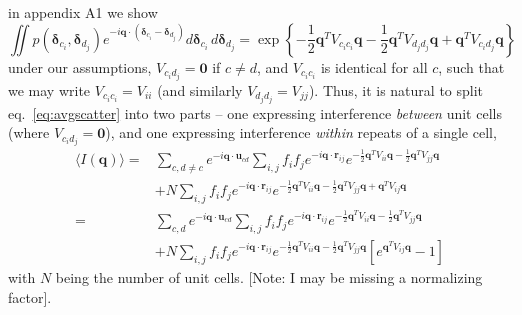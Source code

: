 \documentclass{article}
\begin{document}
in appendix A1 we show 
\begin{equation}
\iint p( \boldsymbol{\delta}_{c_i},  \boldsymbol{\delta}_{d_j} )
e^{-i \mathbf{q} \cdot ( \boldsymbol{\delta}_{c_i}  - \boldsymbol{\delta}_{d_j})} 
d \boldsymbol{\delta}_{c_i}  \, d \boldsymbol{\delta}_{d_j}
=
\exp \left\{
- \frac{1}{2} \mathbf{q}^T V_{c_i c_i} \mathbf{q}
- \frac{1}{2} \mathbf{q}^T V_{d_j d_j} \mathbf{q}
+ \mathbf{q}^T V_{c_i d_j} \mathbf{q}
\right\}
\label{eq:disorder_term}
\end{equation}
under our assumptions, $V_{c_i d_j} = \mathbf{0}$ if $c \neq d$, and $V_{c_i c_i}$ is identical for all $c$, such that we may write $V_{c_i c_i} = V_{ii}$ (and similarly $V_{d_j d_j} = V_{jj}$). Thus, it is natural to split eq.~\ref{eq:avgscatter} into two parts -- one expressing interference \textit{between} unit cells (where $V_{c_i d_j} = \mathbf{0}$), and one expressing interference \textit{within} repeats of a single cell,
\begin{align}
\langle I (\mathbf{q}) \rangle =&
%
\sum\limits_{c,d \neq c} e^{-i \mathbf{q} \cdot \mathbf{u}_{c d}} 
\sum\limits_{i,j} f_i f_j e^{-i \mathbf{q} \cdot \mathbf{r}_{ij}} 
%
e^{
- \frac{1}{2} \mathbf{q}^T V_{ii} \mathbf{q}
- \frac{1}{2} \mathbf{q}^T V_{jj} \mathbf{q}
} \\
%
&+
N \sum\limits_{i,j} f_i f_j e^{-i \mathbf{q} \cdot \mathbf{r}_{ij}} 
%
e^{
- \frac{1}{2} \mathbf{q}^T V_{ii} \mathbf{q}
- \frac{1}{2} \mathbf{q}^T V_{jj} \mathbf{q}
+ \mathbf{q}^T V_{ij} \mathbf{q}
}  \\
%
=&
%
\sum\limits_{c, d} e^{-i \mathbf{q} \cdot \mathbf{u}_{c d}} 
\sum\limits_{i,j} f_i f_j e^{-i \mathbf{q} \cdot \mathbf{r}_{ij}} 
%
e^{
- \frac{1}{2} \mathbf{q}^T V_{ii} \mathbf{q}
- \frac{1}{2} \mathbf{q}^T V_{jj} \mathbf{q}
} \\
%
&+
N \sum\limits_{i,j} f_i f_j e^{-i \mathbf{q} \cdot \mathbf{r}_{ij}} 
%
e^{
- \frac{1}{2} \mathbf{q}^T V_{ii} \mathbf{q}
- \frac{1}{2} \mathbf{q}^T V_{jj} \mathbf{q}
}
%
\left[ 
e^{\mathbf{q}^T V_{ij} \mathbf{q}} - 1
\right]
%
\end{align}
with $N$ being the number of unit cells. [Note: I may be missing a normalizing factor].
\end{document}
